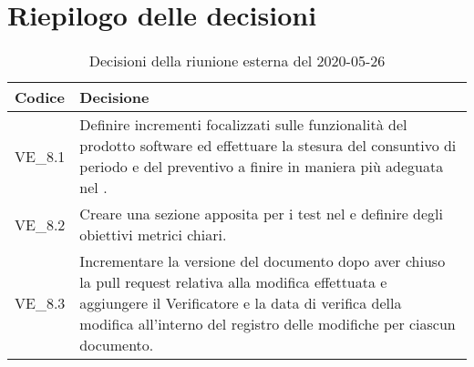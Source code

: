 \section{Riepilogo delle decisioni}
\begin{longtable}{
	 >{\centering}p{} >{}p{} }
	\caption{Decisioni della riunione esterna del 2020-05-26}\\

	\textbf{\color{white}Codice} &
	\textbf{\color{white}Decisione}
	\tabularnewline
	\endhead

	VE\_8.1 & Definire incrementi focalizzati sulle funzionalità del prodotto software ed effettuare la stesura del consuntivo di periodo e del preventivo a finire in maniera più adeguata nel \PdP. \\
	VE\_8.2 & Creare una sezione apposita per i test nel \PdQ{} e definire degli obiettivi metrici chiari. \\
	VE\_8.3 & Incrementare la versione del documento dopo aver chiuso la pull\ped{\textit{G}} request relativa alla modifica effettuata e aggiungere il Verificatore e la data di verifica della modifica all'interno del registro delle modifiche per ciascun documento. \\
\end{longtable}
